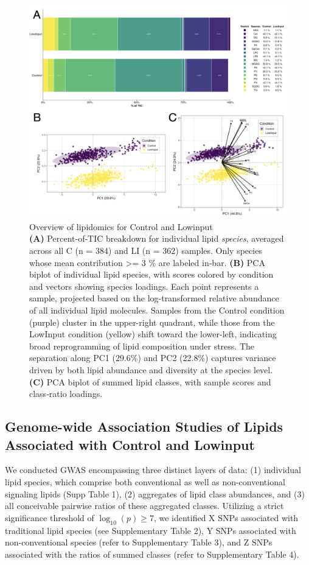 \documentclass[10pt,letterpaper]{article}
\begin{document}
\begin{figure}[htbp]
  \centering
  \includegraphics[width=\textwidth]{fig/main/Fig1.png}

    \caption{Overview of lipidomics for Control and Lowinput \\
    \textbf{(A)} Percent‐of‐TIC breakdown for individual lipid \emph{species}, averaged across all C (n = 384) and LI (n = 362) samples. Only species whose mean contribution >= 3 \% are labeled in‐bar.  
    \textbf{(B)} PCA biplot of individual lipid species, with scores colored by condition and vectors showing species loadings. Each point represents a sample, projected based on the log-transformed relative abundance of all individual lipid molecules. Samples from the Control condition (purple) cluster in the upper-right quadrant, while those from the LowInput condition (yellow) shift toward the lower-left, indicating broad reprogramming of lipid composition under stress. The separation along PC1 (29.6\%) and PC2 (22.8\%) captures variance driven by both lipid abundance and diversity at the species level.
    \textbf{(C)} PCA biplot of summed lipid classes, with sample scores and class‐ratio loadings.}
    
  \label{fig:Fig1_lipid_class}
\end{figure}

\subsection*{Genome-wide Association Studies of Lipids Associated with Control and Lowinput}
We conducted GWAS encompassing three distinct layers of data: (1) individual lipid species, which comprise both conventional  as well as non-conventional signaling lipids (Supp Table 1), (2) aggregates of lipid class abundances, and (3) all conceivable pairwise ratios of these aggregated classes. Utilizing a strict significance threshold of $\log_{10}(p)\ge7$, we identified X SNPs associated with traditional lipid species (see Supplementary Table 2), Y SNPs associated with non-conventional species (refer to Supplementary Table 3), and Z SNPs associated with the ratios of summed classes (refer to Supplementary Table 4).
\end{document}
